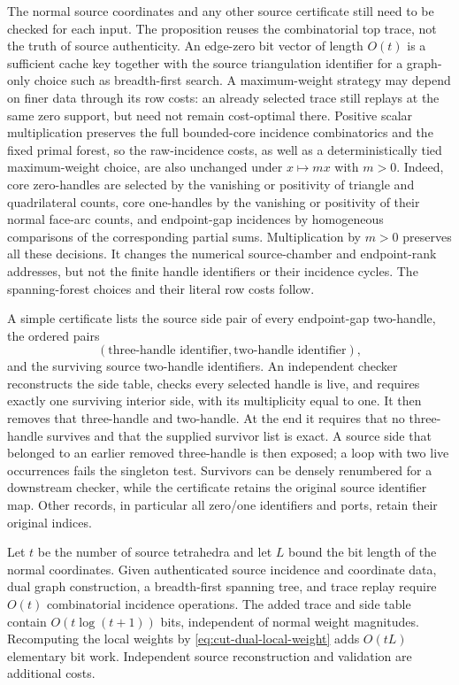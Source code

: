 The normal source coordinates and any other source certificate still need
to be checked for each input.  The proposition reuses the combinatorial
top trace, not the truth of source authenticity.  An edge-zero bit vector
of length $O(t)$ is a sufficient cache key together with the source
triangulation identifier for a graph-only choice such as breadth-first
search.  A maximum-weight strategy may depend on finer data through its
row costs: an already selected trace still replays at the same zero
support, but need not remain cost-optimal there.  Positive scalar
multiplication preserves the full bounded-core incidence combinatorics
and the fixed primal forest, so the raw-incidence costs, as well as a
deterministically tied maximum-weight choice, are also unchanged under
$x\mapsto mx$ with $m>0$.  Indeed, core zero-handles are selected by the
vanishing or positivity of triangle and quadrilateral counts, core
one-handles by the vanishing or positivity of their normal face-arc
counts, and endpoint-gap incidences by homogeneous comparisons of the
corresponding partial sums.  Multiplication by $m>0$ preserves all these
decisions.  It changes the numerical source-chamber and endpoint-rank
addresses, but not the finite handle identifiers or their incidence
cycles.  The spanning-forest choices and their literal row costs follow.

A simple certificate lists the source side pair of every endpoint-gap
two-handle, the ordered pairs
\[
  (\text{three-handle identifier},\text{two-handle identifier}),
\]
and the surviving source two-handle identifiers.  An independent checker
reconstructs the side table, checks every selected handle is live, and
requires exactly one surviving interior side, with its multiplicity
equal to one.  It then removes that three-handle and two-handle.  At the
end it requires that no three-handle survives and that the supplied
survivor list is exact.  A source side that belonged to an earlier removed
three-handle is then exposed; a loop with two live occurrences fails the
singleton test.  Survivors can be densely renumbered for a downstream
checker, while the certificate retains the original source identifier
map.  Other records, in particular all zero/one identifiers and ports,
retain their original indices.

\begin{proposition}
\label{prop:cut-dual-cost}
Let $t$ be the number of source tetrahedra and let $L$ bound the bit length
of the normal coordinates.  Given authenticated source incidence and
coordinate data, dual graph construction, a breadth-first spanning tree,
and trace replay require $O(t)$ combinatorial incidence operations.
The added trace and side table contain $O(t\log(t+1))$ bits, independent
of normal weight magnitudes.  Recomputing the local weights by
\eqref{eq:cut-dual-local-weight} adds $O(tL)$ elementary bit work.
Independent source reconstruction and validation are additional costs.
\end{proposition}

